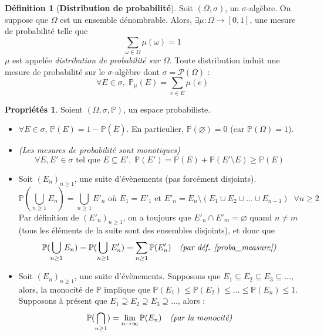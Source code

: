 \documentclass[12pt,a4paper]{report}
\theoremstyle{definition}
\newtheorem{definition}{Définition}[chapter]
\newtheorem*{proprietes}{Propriétés}
\theoremstyle{remark}
\let\labelitemi\labelitemii
\begin{document}
\begin{definition}[\textbf{Distribution de probabilité}]
	Soit $(\Omega, \sigma)$, un $\sigma$-algèbre. 
	On suppose que $\Omega$ est un ensemble dénombrable. Alors, $\exists \mu: \Omega \rightarrow [0,1]$, une mesure de probabilité telle que 
	\[\sum_{\omega \in \Omega} \mu(\omega) =1 \]
	$\mu$ est appelée \textit{distribution de probabilité sur $\Omega$}. Toute distribution induit une mesure de probabilité sur le $\sigma$-algèbre dont $\sigma = \mathcal{P}(\Omega)$ :
	\[ \forall E \in \sigma,\; \mathbb{P}_{\mu}(E) = \sum_{e \in E} \mu(e)\]
\end{definition}

\begin{proprietes}
	Soient $(\Omega, \sigma, \mathbb{P})$, un espace probabiliste.
	
	\begin{itemize}
		\renewcommand{\labelitemi}{\tiny$\bullet$}
		\item $\forall E \in \sigma$, $\mathbb{P}(E) = 1 - \mathbb{P}(\overline{E})$. En particulier, $\mathbb{P}(\varnothing) = 0$ (car $\mathbb{P}(\Omega) = 1$).
		\item \textit{(Les mesures de probabilité sont monotiques)} \[\forall E, E' \in \sigma \text{ tel que } E \subseteq E',\; \mathbb{P}(E') = \mathbb{P}(E) + \mathbb{P}(E' \setminus E) \geq \mathbb{P}(E)\]
		\item Soit $(E_n)_{n \geq 1}$, une suite d'évènements (pas forcément disjoints). \[\mathbb{P}(\bigcup_{n \geq 1} E_n) = \bigcup_{n \geq 1} E'_n \text{ où }E_1 = E'_1\text{ et }E'_n = E_n \setminus (E_1 \cup E_2 \cup \dots \cup E_{n-1}) \;\; \forall n \geq 2\]
		Par définition de $(E'_n)_{n \geq 1}$, on a toujours que $E'_n \cap E'_m = \varnothing$ quand $n \neq m$ (tous les éléments de la suite sont des ensembles disjoints), et donc que
		\[ \mathbb{P}(\bigcup_{n \geq 1} E_n) =  \mathbb{P}(\bigcup_{n \geq 1} E'_n) = \sum_{n \geq 1}\mathbb{P}(E'_n) \quad \text{\textit{(par déf. \ref{proba_measure})}}\]
		\item Soit $(E_n)_{n \geq 1}$, une suite d'évènements. Supposons que $E_1 \subseteq E_2 \subseteq E_3 \subseteq \dots $, alors, la monocité de $\mathbb{P}$ implique que $\mathbb{P}(E_1) \leq \mathbb{P}(E_2) \leq \dots \leq \mathbb{P}(E_n) \leq 1$.
		Supposons à présent que $E_1 \supseteq E_2 \supseteq E_3 \supseteq \dots$, alors :
		\[ \mathbb{P}(\bigcap_{n \geq 1}) = \lim_{n \rightarrow \infty} \mathbb{P}(E_n) \quad \text{\textit{(par la monocité)}}\]
	\end{itemize}
\end{proprietes}
\end{document}
